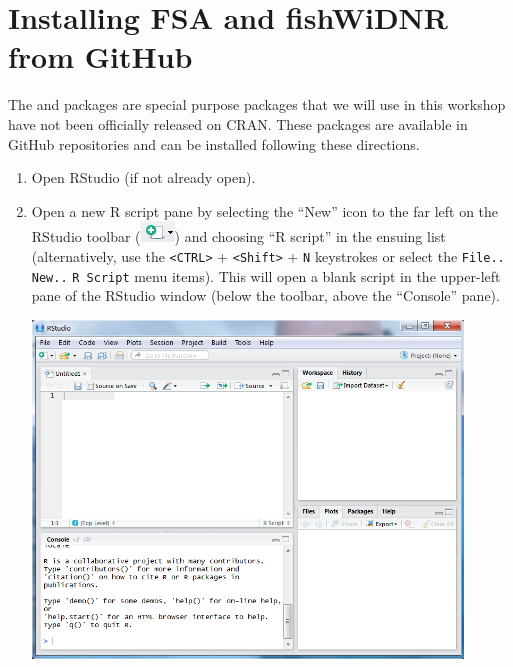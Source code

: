 \documentclass{article}\usepackage[]{graphicx}\usepackage[]{color}
\begin{document}
\newpage
\section{Installing FSA and fishWiDNR from GitHub}
The  and  packages are special purpose packages that we will use in this workshop have not been officially released on CRAN.  These packages are available in GitHub repositories and can be installed following these directions.
\begin{enumerate}
  \item Open RStudio (if not already open).

  \item Open a new R script pane by selecting the ``New'' icon to the far left on the RStudio toolbar (\includegraphics[scale=0.8]{Figs/RStudio_Icon_New.png}) and choosing ``R script'' in the ensuing list (alternatively, use the \verb+<CTRL>+ + \verb+<Shift>+ + \verb+N+ keystrokes or select the \verb+File..+ \verb+New..+ \verb+R Script+ menu items).  This will open a blank script in the upper-left pane of the RStudio window (below the toolbar, above the ``Console'' pane).
\begin{center}
  \includegraphics[width=4.5in]{Figs/RStudio_NewScript.png}
\end{center}


\end{enumerate}
\end{document}
